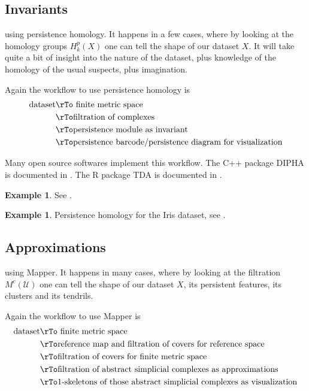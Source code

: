 \documentclass[12pt]{amsart}
\theoremstyle{definition}
\newtheorem{example}[theorem]{Example}
\begin{document}
\subsection{Invariants} using persistence homology. It happens in a few cases, where by looking at the homology groups $H_k^p(X)$ one can tell the shape of our dataset $X$. It will take quite a bit of insight into the nature of the dataset, plus knowledge of the homology of the usual suspects, plus imagination.

Again the workflow to use persistence homology is
\begin{align*}\text{dataset} & \rTo \text{ finite metric space} \\
 & \rTo \text{filtration of complexes} \\
 & \rTo \text{persistence module as invariant} \\
 & \rTo \text{persistence barcode/persistence diagram for visualization}
\end{align*}

Many open source softwares implement this workflow. The C++ package DIPHA is documented in \cite{DIPHA}. The R package TDA is documented in \cite{RPackageTDA}.

\begin{example} See \cite[example 2.4]{CarlssonTandD}.
\end{example}

\begin{example} Persistence homology for the Iris dataset, see \cite[2.2.4]{TDAofAyasdi}.
\end{example}

\subsection{Approximations} using Mapper. It happens in many cases, where by looking at the filtration $M^c(\mathcal{U})$ one can tell the shape of our dataset $X$, its persistent features, its clusters and its tendrils.

Again the workflow to use Mapper is
\begin{align*}
\text{dataset} & \rTo \text{ finite metric space} \\
 & \rTo \text{reference map and filtration of covers for reference space} \\
 & \rTo \text{filtration of covers for finite metric space} \\
 & \rTo \text{filtration of abstract simplicial complexes as approximations} \\
 & \rTo \text{1-skeletons of those abstract simplicial complexes as visualization}
\end{align*}
\end{document}
